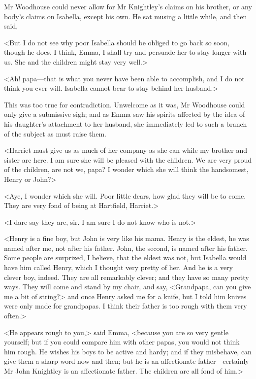 Mr Woodhouse could never allow for Mr Knightley's claims on his brother, or any body's claims on Isabella, except his own. He sat musing a little while, and then said,

<But I do not see why poor Isabella should be obliged to go back so soon, though he does. I think, Emma, I shall try and persuade her to stay longer with us. She and the children might stay very well.>

<Ah! papa—that is what you never have been able to accomplish, and I do not think you ever will. Isabella cannot bear to stay behind her husband.>

This was too true for contradiction. Unwelcome as it was, Mr Woodhouse could only give a submissive sigh; and as Emma saw his spirits affected by the idea of his daughter's attachment to her husband, she immediately led to such a branch of the subject as must raise them.

<Harriet must give us as much of her company as she can while my brother and sister are here. I am sure she will be pleased with the children. We are very proud of the children, are not we, papa? I wonder which she will think the handsomest, Henry or John?>

<Aye, I wonder which she will. Poor little dears, how glad they will be to come. They are very fond of being at Hartfield, Harriet.>

<I dare say they are, sir. I am sure I do not know who is not.>

<Henry is a fine boy, but John is very like his mama. Henry is the eldest, he was named after me, not after his father. John, the second, is named after his father. Some people are surprized, I believe, that the eldest was not, but Isabella would have him called Henry, which I thought very pretty of her. And he is a very clever boy, indeed. They are all remarkably clever; and they have so many pretty ways. They will come and stand by my chair, and say, <Grandpapa, can you give me a bit of string?> and once Henry asked me for a knife, but I told him knives were only made for grandpapas. I think their father is too rough with them very often.>

<He appears rough to you,> said Emma, <because you are so very gentle yourself; but if you could compare him with other papas, you would not think him rough. He wishes his boys to be active and hardy; and if they misbehave, can give them a sharp word now and then; but he is an affectionate father—certainly Mr John Knightley is an affectionate father. The children are all fond of him.>

